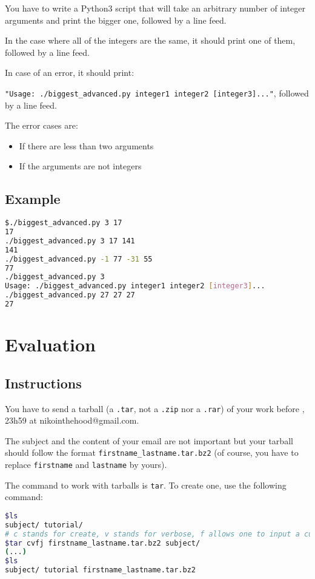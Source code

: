\documentclass[12pt]{article}
\begin{document}
You have to write a Python3 script that will take an arbitrary number of integer arguments and print the bigger one, followed by a line feed.

In the case where all of the integers are the same, it should print one of them, followed by a line feed.

In case of an error, it should print:

\texttt{"Usage: ./biggest\_advanced.py integer1 integer2 [integer3]..."}, followed by a line feed.

The error cases are:

\begin{itemize}
	\item If there are less than two arguments
	\item If the arguments are not integers
\end{itemize}

\subsection{Example}

\begin{lstlisting}[language=bash]
$./biggest_advanced.py 3 17
17
./biggest_advanced.py 3 17 141
141
./biggest_advanced.py -1 77 -31 55
77
./biggest_advanced.py 3
Usage: ./biggest_advanced.py integer1 integer2 [integer3]...
./biggest_advanced.py 27 27 27
27
\end{lstlisting}

\section{Evaluation}
\subsection{Instructions}

You have to send a tarball (a \texttt{.tar}, not a \texttt{.zip} nor a \texttt{.rar}) of your work before , 23h59 at nikointhehood@gmail.com.

The subject and the content of your email are not important but your tarball should follow the format \texttt{firstname\_lastname.tar.bz2} (of course, you have to replace \texttt{firstname} and \texttt{lastname} by yours).

The command to work with tarballs is \texttt{tar}. To create one, use the following command:

\begin{lstlisting}[language=bash]
$ls
subject/ tutorial/
# c stands for create, v stands for verbose, f allows one to input a custom name for the archive and j indicates the usage of bzip2
$tar cvfj firstname_lastname.tar.bz2 subject/
(...)
$ls
subject/ tutorial firstname_lastname.tar.bz2
\end{lstlisting}
\end{document}
